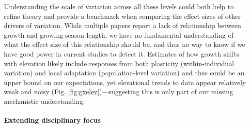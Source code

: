 \documentclass[11pt]{article}
\begin{document}

Understanding the scale of variation across all these levels could both help to refine theory and provide a benchmark when comparing the effect sizes of other drivers of variation. While multiple papers report a lack of relationship between growth and growing season length, we have no fundamental understanding of what the effect size of this relationship should be, and thus no way to know if we have good power in current studies to detect it. Estimates of how growth shifts with elevation likely include responses from both plasticity (within-individual variation) and local adaptation (population-level variation) and thus could be an upper bound on our expectations, yet elevational trends to date appear relatively weak and noisy (Fig. \ref{fig:gxelev})---suggesting this is only part of our missing mechanistic understanding. 

\paragraph{Extending disciplinary focus} 
\end{document}
